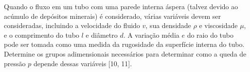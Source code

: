 Quando o fluxo em um tubo com uma parede interna áspera (talvez devido ao acúmulo de depósitos minerais) é considerado, várias variáveis devem ser consideradas, incluindo a velocidade do fluido $v$, sua densidade $\rho$ e viscosidade $\mu$, e o comprimento do tubo $l$ e diâmetro $d$. A variação média $e$ do raio do tubo pode ser tomada como uma medida da rugosidade da superfície interna do tubo. Determine os grupos adimensionais necessários para determinar como a queda de pressão $p$ depende dessas variáveis [10, 11].
